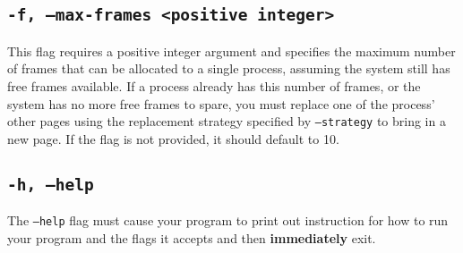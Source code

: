 \documentclass[10pt]{article}
\begin{document}
\subsection{\texttt{-f, --max-frames <positive integer>}}

This flag requires a positive integer argument and specifies the maximum number of frames that can be
allocated to a single process, assuming the system still has free frames available. If a process already
has this number of frames, or the system has no more free frames to spare, you must replace one of the
process' other pages using the replacement strategy specified by \texttt{--strategy} to bring in a new page. If the flag is not provided,
it should default to 10.

\subsection{\texttt{-h, --help}}

The \texttt{--help} flag must cause your program to print out instruction for how to run your program and the flags it accepts and then \textbf{immediately} exit.
\end{document}
